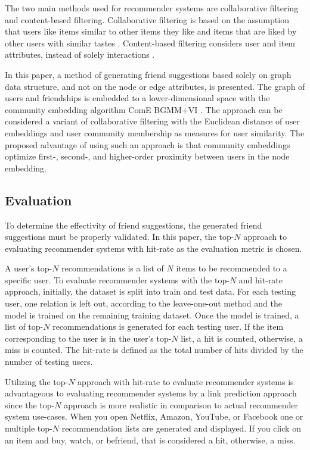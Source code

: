 \documentclass[conference]{IEEEtran}
\begin{document}
The two main methods used for recommender systems are collaborative filtering and content-based filtering. Collaborative filtering is based on the assumption that users like items similar to other items they like and items that are liked by other users with similar tastes \cite{Grover17, Su2009ASO}. Content-based filtering considers user and item attributes, instead of solely interactions \cite{Rocca19, Lops2011SurveyCB}.

In this paper, a method of generating friend suggestions based solely on graph data structure, and not on the node or edge attributes, is presented. The graph of users and friendships is embedded to a lower-dimensional space with the community embedding algorithm ComE BGMM+VI \cite{ComE, ComE+, ComE_BGMM_GH}. The approach can be considered a variant of collaborative filtering with the Euclidean distance of user embeddings and user community membership as measures for user similarity. The proposed advantage of using such an approach is that community embeddings optimize first-, second-, and higher-order proximity between users in the node embedding.

\subsection{Evaluation}

To determine the effectivity of friend suggestions, the generated friend suggestions must be properly validated. In this paper, the top-$N$ approach to evaluating recommender systems with hit-rate as the evaluation metric is chosen.

A user's top-$N$ recommendations is a list of $N$ items to be recommended to a specific user. To evaluate recommender systems with the top-$N$ and hit-rate approach, initially, the dataset is split into train and test data. For each testing user, one relation is left out, according to the leave-one-out method and the model is trained on the remaining training dataset. Once the model is trained, a list of top-$N$ recommendations is generated for each testing user. If the item corresponding to the user is in the user's top-$N$ list, a hit is counted, otherwise, a miss is counted. The hit-rate is defined as the total number of hits divided by the number of testing users.

Utilizing the top-$N$ approach with hit-rate to evaluate recommender systems is advantageous to evaluating recommender systems by a link prediction approach since the top-$N$ approach is more realistic in comparison to actual recommender system use-cases. When you open Netflix, Amazon, YouTube, or Facebook one or multiple top-$N$ recommendation lists are generated and displayed. If you click on an item and buy, watch, or befriend, that is considered a hit, otherwise, a miss.
\end{document}
